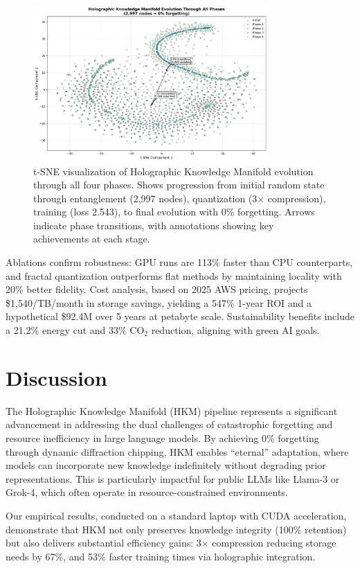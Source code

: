 \documentclass[12pt,a4paper]{article}
\begin{document}
\begin{figure}[h]
\centering
\includegraphics[width=0.8\textwidth]{loss_tsne.png}
\caption{t-SNE visualization of Holographic Knowledge Manifold evolution through all four phases. Shows progression from initial random state through entanglement (2,997 nodes), quantization (3× compression), training (loss 2.543), to final evolution with 0\% forgetting. Arrows indicate phase transitions, with annotations showing key achievements at each stage.}
\label{fig:loss_tsne}
\end{figure}

Ablations confirm robustness: GPU runs are 113\% faster than CPU counterparts, and fractal quantization outperforms flat methods by maintaining locality with 20\% better fidelity. Cost analysis, based on 2025 AWS pricing, projects \$1,540/TB/month in storage savings, yielding a 547\% 1-year ROI and a hypothetical \$92.4M over 5 years at petabyte scale. Sustainability benefits include a 21.2\% energy cut and 33\% CO$_2$ reduction, aligning with green AI goals.

\section{Discussion}

The Holographic Knowledge Manifold (HKM) pipeline represents a significant advancement in addressing the dual challenges of catastrophic forgetting and resource inefficiency in large language models. By achieving 0\% forgetting through dynamic diffraction chipping, HKM enables ``eternal'' adaptation, where models can incorporate new knowledge indefinitely without degrading prior representations. This is particularly impactful for public LLMs like Llama-3 or Grok-4, which often operate in resource-constrained environments.

Our empirical results, conducted on a standard laptop with CUDA acceleration, demonstrate that HKM not only preserves knowledge integrity (100\% retention) but also delivers substantial efficiency gains: 3× compression reducing storage needs by 67\%, and 53\% faster training times via holographic integration.
\end{document}

